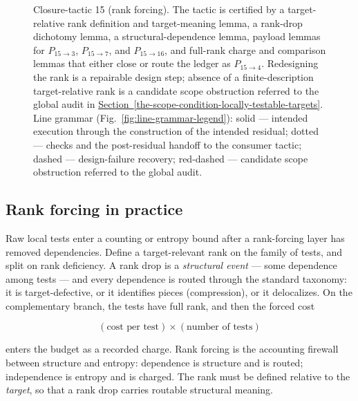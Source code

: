 \documentclass[
  11pt,
]{article}
\theoremstyle{definition}
\newcommand{\secref}[1]{\hyperref[#1]{Section~\ref*{#1}}}
\begin{document}
\begin{figure}[p]
{%
}
\caption[Closure-tactic 15: rank forcing]{Closure-tactic 15 (rank forcing).  The tactic is certified by a target-relative rank definition and target-meaning lemma, a rank-drop dichotomy lemma, a structural-dependence lemma, payload lemmas for \(P_{15\to3}\), \(P_{15\to7}\), and \(P_{15\to16}\), and full-rank charge and comparison lemmas that either close or route the ledger as \(P_{15\to4}\).  Redesigning the rank is a repairable design step; absence of a finite-description target-relative rank is a candidate scope obstruction referred to the global audit in \secref{the-scope-condition-locally-testable-targets}.  Line grammar (Fig.~\ref{fig:line-grammar-legend}): solid --- intended execution through the construction of the intended residual; dotted --- checks and the post-residual handoff to the consumer tactic; dashed --- design-failure recovery; red-dashed --- candidate scope obstruction referred to the global audit.}
\label{fig:ct15-rank-forcing}
\end{figure}
\FloatBarrier

\subsection*{Rank forcing in practice}

Raw local tests enter a counting or entropy bound after a rank-forcing
layer has removed dependencies. Define a target-relevant rank on the
family of tests, and split on rank deficiency. A rank drop is a
\emph{structural event} --- some dependence among tests --- and every
dependence is routed through the standard taxonomy: it is
target-defective, or it identifies pieces (compression), or it
delocalizes. On the complementary branch, the tests have full rank, and
then the forced cost

\[
(\text{cost per test}) \times (\text{number of tests})
\]

enters the budget as a recorded charge. Rank forcing is the accounting
firewall between structure and entropy: dependence is structure and is
routed; independence is entropy and is charged. The rank must be defined
relative to the \emph{target}, so that a rank drop carries routable
structural meaning.
\end{document}

